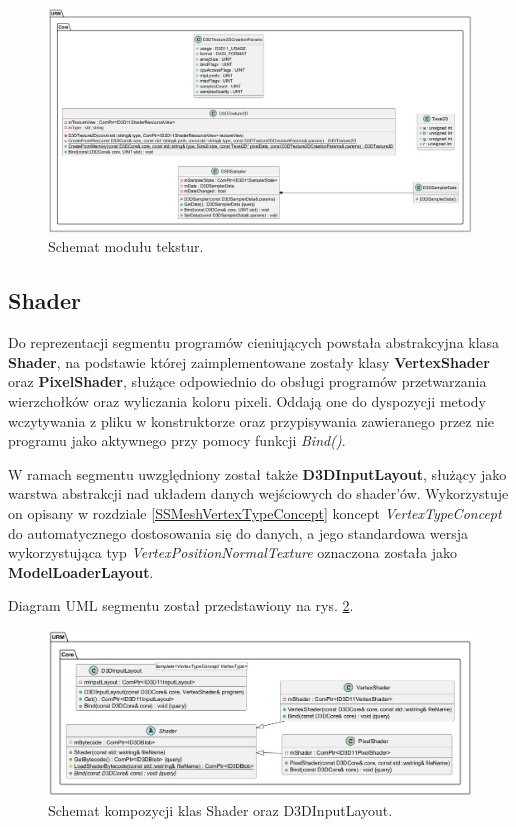 	\begin{figure}[h!]
		\centering
		\includegraphics[width=\textwidth]{images/UML/texture.png}
		\caption{Schemat modułu tekstur.}
		\label{UML_Textures}
	\end{figure}
	
\subsection{Shader}
	Do reprezentacji segmentu programów cieniujących powstała abstrakcyjna klasa \textbf{Shader}, na podstawie której zaimplementowane zostały klasy \textbf{VertexShader} oraz \textbf{PixelShader}, służące odpowiednio do obsługi programów przetwarzania wierzchołków oraz wyliczania koloru pixeli. Oddają one do dyspozycji metody wczytywania z pliku w konstruktorze oraz przypisywania zawieranego przez nie programu jako aktywnego przy pomocy funkcji \textit{Bind()}.
	
	W ramach segmentu uwzględniony został także \textbf{D3DInputLayout}, służący jako warstwa abstrakcji nad układem danych wejściowych do shader'ów. Wykorzystuje on opisany w rozdziale \ref{SSMeshVertexTypeConcept} koncept \textit{VertexTypeConcept} do automatycznego dostosowania się do danych, a jego standardowa wersja wykorzystująca typ \textit{VertexPositionNormalTexture} oznaczona została jako \textbf{ModelLoaderLayout}.
	
	Diagram UML segmentu został przedstawiony na rys. \ref{UML_ShaderPipeline}.
	
	\begin{figure}[h!]
		\centering
		\includegraphics[width=\textwidth]{images/UML/shader.png}
		\caption{Schemat kompozycji klas Shader oraz D3DInputLayout.}
		\label{UML_ShaderPipeline}
	\end{figure}
	
